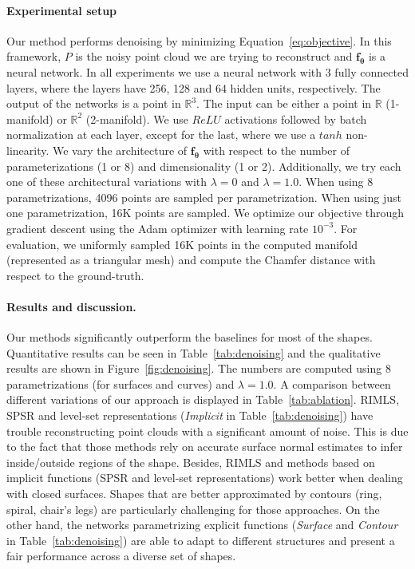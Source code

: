 \paragraph*{Experimental setup}
Our method performs denoising by minimizing Equation~\ref{eq:objective}.
In this framework, $P$ is the noisy point cloud we are trying to reconstruct and $\bm{f_\theta}$ is a neural network.
In all experiments we use a neural network with 3 fully connected layers,
where the layers have 256, 128 and 64 hidden units, respectively.
The output of the networks is a point in $\mathbb{R}^3$.
The input can be either a point in $\mathbb{R}$ (1-manifold) or $\mathbb{R}^2$ (2-manifold).
We use $ReLU$ activations followed by batch normalization at each layer, except for the last, where we use a $tanh$ non-linearity.
We vary the architecture of $\bm{f_\theta}$ with respect to the number
of parameterizations (1 or 8) and dimensionality (1 or 2).
Additionally, we try each one of these architectural variations with
$\lambda=0$ and $\lambda=1.0$.
When using 8 parametrizations, 4096 points are sampled per parametrization.
When using just one parametrization, 16K points are sampled.
We optimize our objective through gradient descent using the Adam optimizer
with learning rate $10^{-3}$.
For evaluation, we uniformly sampled 16K points in the computed manifold (represented as a triangular mesh) and compute the Chamfer distance with respect to the ground-truth.

\paragraph*{Results and discussion.}
Our methods significantly outperform the baselines for most of the shapes.
Quantitative results can be seen in Table~\ref{tab:denoising} and the qualitative results are shown in Figure~\ref{fig:denoising}.
The numbers are computed using 8 parametrizations (for surfaces and curves) and
$\lambda=1.0$.
A comparison between different variations of our approach is displayed in Table~\ref{tab:ablation}.
RIMLS, SPSR and level-set representations (\emph{Implicit} in Table~\ref{tab:denoising}) 
have trouble reconstructing point clouds with a significant amount of noise.
This is due to the fact that those methods rely on accurate surface normal estimates to infer
inside/outside regions of the shape.
Besides, RIMLS and methods based on implicit functions (SPSR and level-set representations) work better when dealing with closed surfaces. 
Shapes that are better approximated by contours (ring, spiral, chair's legs) are particularly challenging for those approaches.
On the other hand, the networks parametrizing explicit functions (\emph{Surface} and \emph{Contour} in Table~\ref{tab:denoising}) are able to adapt to different structures and
present a fair performance across a diverse set of shapes.


